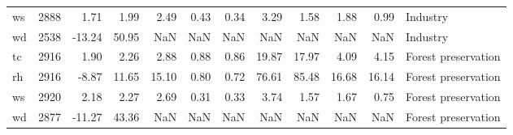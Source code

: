 \begin{table}
\begin{tabular}{lrrrrrrrrrrl}
ws &   2888 &   1.71 &   1.99 &   2.49 &  0.43 &  0.34 &   3.29 &   1.58 &   1.88 &   0.99 &             Industry \\
wd &   2538 & -13.24 &  50.95 &    NaN &   NaN &   NaN &    NaN &    NaN &    NaN &    NaN &             Industry \\
tc &   2916 &   1.90 &   2.26 &   2.88 &  0.88 &  0.86 &  19.87 &  17.97 &   4.09 &   4.15 &  Forest preservation \\
rh &   2916 &  -8.87 &  11.65 &  15.10 &  0.80 &  0.72 &  76.61 &  85.48 &  16.68 &  16.14 &  Forest preservation \\
ws &   2920 &   2.18 &   2.27 &   2.69 &  0.31 &  0.33 &   3.74 &   1.57 &   1.67 &   0.75 &  Forest preservation \\
wd &   2877 & -11.27 &  43.36 &    NaN &   NaN &   NaN &    NaN &    NaN &    NaN &    NaN &  Forest preservation \\
\bottomrule
\end{tabular}
\end{table}

